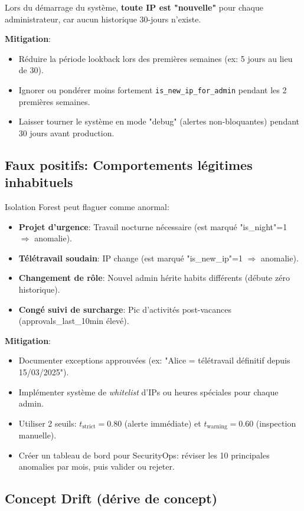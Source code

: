 Lors du démarrage du système, \textbf{toute IP est "nouvelle"} pour chaque administrateur, car aucun historique 30-jours n'existe.

\textbf{Mitigation}:
\begin{itemize}
	\item Réduire la période lookback lors des premières semaines (ex: 5 jours au lieu de 30).
	\item Ignorer ou pondérer moins fortement \texttt{is\_new\_ip\_for\_admin} pendant les 2 premières semaines.
	\item Laisser tourner le système en mode "debug" (alertes non-bloquantes) pendant 30 jours avant production.
\end{itemize}

\subsection{Faux positifs: Comportements légitimes inhabituels}

Isolation Forest peut flaguer comme anormal:
\begin{itemize}
	\item \textbf{Projet d'urgence}: Travail nocturne nécessaire (est marqué "is\_night"=1 $\Rightarrow$ anomalie).
	\item \textbf{Télétravail soudain}: IP change (est marqué "is\_new\_ip"=1 $\Rightarrow$ anomalie).
	\item \textbf{Changement de rôle}: Nouvel admin hérite habits différents (débute zéro historique).
	\item \textbf{Congé suivi de surcharge}: Pic d'activités post-vacances (approvals\_last\_10min élevé).
\end{itemize}

\textbf{Mitigation}:
\begin{itemize}
	\item Documenter exceptions approuvées (ex: "Alice = télétravail définitif depuis 15/03/2025").
	\item Implémenter système de \textit{whitelist} d'IPs ou heures spéciales pour chaque admin.
	\item Utiliser 2 seuils: $t_{\text{strict}}=0.80$ (alerte immédiate) et $t_{\text{warning}}=0.60$ (inspection manuelle).
	\item Créer un tableau de bord pour SecurityOps: réviser les 10 principales anomalies par mois, puis valider ou rejeter.
\end{itemize}

\subsection{Concept Drift (dérive de concept)}

